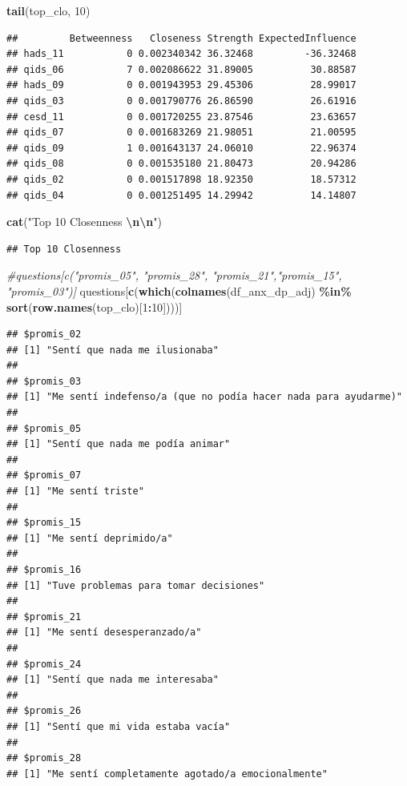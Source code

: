 \documentclass[
]{article}
\newenvironment{Shaded}{\begin{snugshade}}{\end{snugshade}}
\newcommand{\CommentTok}[1]{\textcolor[rgb]{0.56,0.35,0.01}{\textit{#1}}}
\newcommand{\DecValTok}[1]{\textcolor[rgb]{0.00,0.00,0.81}{#1}}
\newcommand{\FunctionTok}[1]{\textcolor[rgb]{0.13,0.29,0.53}{\textbf{#1}}}
\newcommand{\NormalTok}[1]{#1}
\newcommand{\SpecialCharTok}[1]{\textcolor[rgb]{0.81,0.36,0.00}{\textbf{#1}}}
\newcommand{\StringTok}[1]{\textcolor[rgb]{0.31,0.60,0.02}{#1}}
\begin{document}
\begin{Shaded}
\begin{Highlighting}[]
\FunctionTok{tail}\NormalTok{(top\_clo, }\DecValTok{10}\NormalTok{)}
\end{Highlighting}
\end{Shaded}

\begin{verbatim}
##         Betweenness   Closeness Strength ExpectedInfluence
## hads_11           0 0.002340342 36.32468         -36.32468
## qids_06           7 0.002086622 31.89005          30.88587
## hads_09           0 0.001943953 29.45306          28.99017
## qids_03           0 0.001790776 26.86590          26.61916
## cesd_11           0 0.001720255 23.87546          23.63657
## qids_07           0 0.001683269 21.98051          21.00595
## qids_09           1 0.001643137 24.06010          22.96374
## qids_08           0 0.001535180 21.80473          20.94286
## qids_02           0 0.001517898 18.92350          18.57312
## qids_04           0 0.001251495 14.29942          14.14807
\end{verbatim}

\begin{Shaded}
\begin{Highlighting}[]
\FunctionTok{cat}\NormalTok{(}\StringTok{"Top 10 Closenness }\SpecialCharTok{\textbackslash{}n\textbackslash{}n}\StringTok{"}\NormalTok{)}
\end{Highlighting}
\end{Shaded}

\begin{verbatim}
## Top 10 Closenness
\end{verbatim}

\begin{Shaded}
\begin{Highlighting}[]
\CommentTok{\#questions[c("promis\_05", "promis\_28", "promis\_21","promis\_15", "promis\_03")]}
\NormalTok{questions[}\FunctionTok{c}\NormalTok{(}\FunctionTok{which}\NormalTok{(}\FunctionTok{colnames}\NormalTok{(df\_anx\_dp\_adj) }\SpecialCharTok{\%in\%} \FunctionTok{sort}\NormalTok{(}\FunctionTok{row.names}\NormalTok{(top\_clo)[}\DecValTok{1}\SpecialCharTok{:}\DecValTok{10}\NormalTok{])))] }
\end{Highlighting}
\end{Shaded}

\begin{verbatim}
## $promis_02
## [1] "Sentí que nada me ilusionaba"
## 
## $promis_03
## [1] "Me sentí indefenso/a (que no podía hacer nada para ayudarme)"
## 
## $promis_05
## [1] "Sentí que nada me podía animar"
## 
## $promis_07
## [1] "Me sentí triste"
## 
## $promis_15
## [1] "Me sentí deprimido/a"
## 
## $promis_16
## [1] "Tuve problemas para tomar decisiones"
## 
## $promis_21
## [1] "Me sentí desesperanzado/a"
## 
## $promis_24
## [1] "Sentí que nada me interesaba"
## 
## $promis_26
## [1] "Sentí que mi vida estaba vacía"
## 
## $promis_28
## [1] "Me sentí completamente agotado/a emocionalmente"
\end{verbatim}
\end{document}
